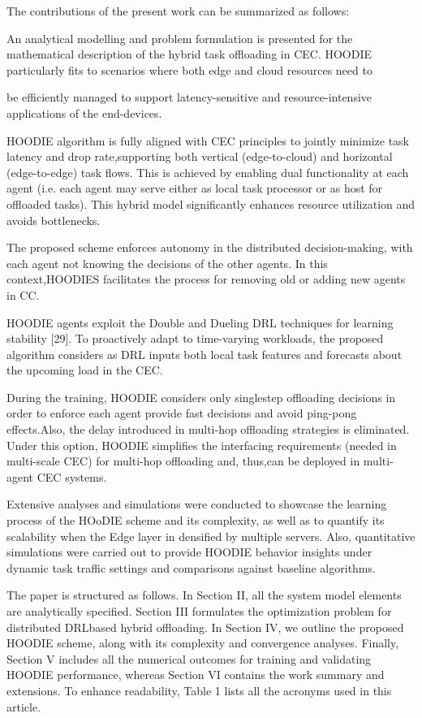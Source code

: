 \documentclass{article}
\begin{document}
The contributions of the present work can be summarized as follows:

An analytical modelling and problem formulation is presented for the mathematical description of the hybrid task offloading in CEC. HOODIE particularly fits to scenarios where both edge and cloud resources need to

be efficiently managed to support latency-sensitive and resource-intensive applications of the end-devices.

HOODIE algorithm is fully aligned with CEC principles to jointly minimize task latency and drop rate,supporting both vertical (edge-to-cloud) and horizontal (edge-to-edge) task flows. This is achieved by enabling dual functionality at each agent (i.e. each agent may serve either as local task processor or as host for offloaded tasks). This hybrid model significantly enhances resource utilization and avoids bottlenecks.

The proposed scheme enforces autonomy in the distributed decision-making, with each agent not knowing the decisions of the other agents. In this context,HOODIES facilitates the process for removing old or adding new agents in CC.

HOODIE agents exploit the Double and Dueling DRL techniques for learning stability [29]. To proactively adapt to time-varying workloads, the proposed algorithm considers as DRL inputs both local task features and forecasts about the upcoming load in the CEC.

During the training, HOODIE considers only singlestep offloading decisions in order to enforce each agent provide fast decisions and avoid ping-pong effects.Also, the delay introduced in multi-hop offloading strategies is eliminated. Under this option, HOODIE simplifies the interfacing requirements (needed in multi-scale CEC) for multi-hop offloading and, thus,can be deployed in multi-agent CEC systems.

Extensive analyses and simulations were conducted to showcase the learning process of the HOoDIE scheme and its complexity, as well as to quantify its scalability when the Edge layer in densified by multiple servers. Also, quantitative simulations were carried out to provide HOODIE behavior insights under dynamic task traffic settings and comparisons against baseline algorithms.

The paper is structured as follows. In Section II, all the system model elements are analytically specified. Section III formulates the optimization problem for distributed DRLbased hybrid offloading. In Section IV, we outline the proposed HOODIE scheme, along with its complexity and convergence analyses. Finally, Section V includes all the numerical outcomes for training and validating HOODIE performance, whereas Section VI contains the work summary and extensions. To enhance readability, Table 1 lists all the acronyms used in this article.
\end{document}
